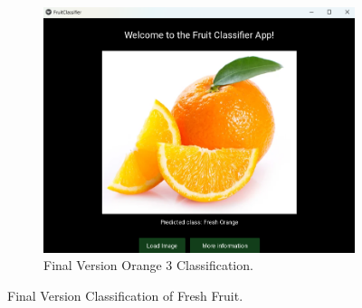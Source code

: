 \documentclass[conference]{IEEEtran}
\begin{document}
\begin{figure}[h]
\begin{subfigure}[b]{0.48\linewidth}
        \includegraphics[width=\linewidth]{Mlayer orage3.png}
        \caption{Final Version Orange 3 Classification.}
        \label{figFB}
    \end{subfigure}
    \caption{Final Version Classification of Fresh Fruit.}
    \label{FigMF}
\end{figure}
\end{document}
